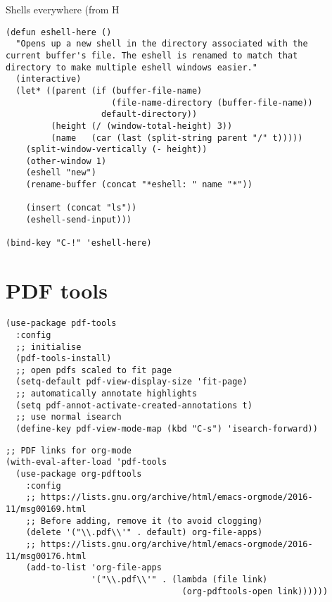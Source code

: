 \documentclass[12pt]{article}
\begin{document}
Shells everywhere (from H

\begin{verbatim}
(defun eshell-here ()
  "Opens up a new shell in the directory associated with the
current buffer's file. The eshell is renamed to match that
directory to make multiple eshell windows easier."
  (interactive)
  (let* ((parent (if (buffer-file-name)
                     (file-name-directory (buffer-file-name))
                   default-directory))
         (height (/ (window-total-height) 3))
         (name   (car (last (split-string parent "/" t)))))
    (split-window-vertically (- height))
    (other-window 1)
    (eshell "new")
    (rename-buffer (concat "*eshell: " name "*"))

    (insert (concat "ls"))
    (eshell-send-input)))

(bind-key "C-!" 'eshell-here)
\end{verbatim}

\section{PDF tools}
\label{sec:org4b1f7fb}

\begin{verbatim}
(use-package pdf-tools
  :config
  ;; initialise
  (pdf-tools-install)
  ;; open pdfs scaled to fit page
  (setq-default pdf-view-display-size 'fit-page)
  ;; automatically annotate highlights
  (setq pdf-annot-activate-created-annotations t)
  ;; use normal isearch
  (define-key pdf-view-mode-map (kbd "C-s") 'isearch-forward))
\end{verbatim}

\begin{verbatim}
;; PDF links for org-mode
(with-eval-after-load 'pdf-tools
  (use-package org-pdftools
    :config
    ;; https://lists.gnu.org/archive/html/emacs-orgmode/2016-11/msg00169.html
    ;; Before adding, remove it (to avoid clogging)
    (delete '("\\.pdf\\'" . default) org-file-apps)
    ;; https://lists.gnu.org/archive/html/emacs-orgmode/2016-11/msg00176.html
    (add-to-list 'org-file-apps
                 '("\\.pdf\\'" . (lambda (file link)
                                   (org-pdftools-open link))))))
\end{verbatim}
\end{document}
